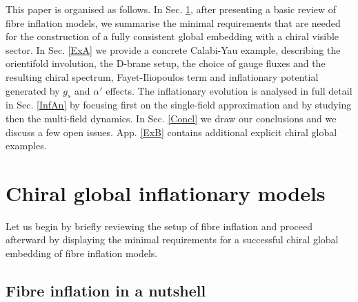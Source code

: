 \documentclass[11pt,a4paper]{article}
\begin{document}
This paper is organised as follows. In Sec. \ref{MinReq}, after presenting a basic review of fibre inflation models, we summarise the minimal requirements that are needed for the construction of a fully consistent global embedding with a chiral visible sector. In Sec. \ref{ExA} we provide a concrete Calabi-Yau example, describing the orientifold involution, the D-brane setup, the choice of gauge fluxes and the resulting chiral spectrum, Fayet-Iliopoulos term and inflationary potential generated by $g_s$ and $\alpha'$ effects. The inflationary evolution is analysed in full detail in Sec. \ref{InfAn} by focusing first on the single-field approximation and by studying then the multi-field dynamics. In Sec. \ref{Concl} we draw our conclusions and we discuss a few open issues. App. \ref{ExB} contains additional explicit chiral global examples.

\section{Chiral global inflationary models}
\label{MinReq}

Let us begin by briefly reviewing the setup of fibre inflation and proceed afterward by displaying the minimal requirements for a successful chiral global embedding of fibre inflation models.

\subsection{Fibre inflation in a nutshell}
\end{document}
